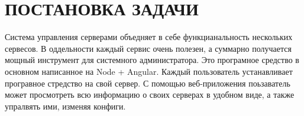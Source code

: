 \section{ПОСТАНОВКА ЗАДАЧИ}
\label{sec:problem}

Система управления серверами объедняет в себе функцианальность нескольких сервесов. В оддельности каждый сервис очень полезен, а суммарно получается мощный инструмент для системного администратора. Это програмное средство в основном написанное на Node + Angular. Каждый пользователь устанавливает програвное стредство на свой сервер. С помощью веб-приложения поьзаватель может просмотреть всю информацию о своих серверах в удобном виде, а также упралвять ими, изменяя конфиги.




